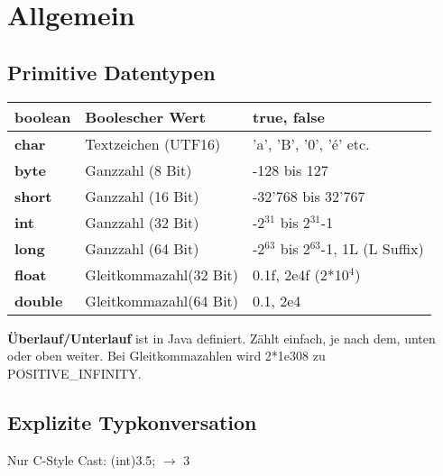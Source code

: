 \vspace{-0.5cm}
\section*{Allgemein}
	\begin{minipage}[t]{10cm}
		\subsection*{Primitive Datentypen}
			\begin{tabular}{|>{\bfseries}l l l|}
				\hline   boolean & Boolescher Wert & true, false
				\\\hline char & Textzeichen (UTF16) & 'a', 'B', '0', 'é' etc.
				\\\hline byte & Ganzzahl (8 Bit) & -128 bis 127
				\\\hline short & Ganzzahl (16 Bit) & -32'768 bis 32'767
				\\\hline int & Ganzzahl (32 Bit) & -2$^{31}$ bis 2$^{31}$-1
				\\\hline long & Ganzzahl (64 Bit) & -2$^{63}$ bis 2$^{63}$-1, 1L (L Suffix)
				\\\hline float & Gleitkommazahl(32 Bit) & 0.1f, 2e4f (2*10$^4$)
				\\\hline double & Gleitkommazahl(64 Bit) & 0.1, 2e4 
				\\\hline
			\end{tabular}
		\end{minipage}
		\hspace*{0.6cm}
		\begin{minipage}[t]{8.4cm}
			\vspace*{0.7cm}
			\textbf{Überlauf/Unterlauf} ist in Java definiert. Zählt einfach, je nach dem, unten oder oben weiter. Bei Gleitkommazahlen wird 2*1e308 zu POSITIVE\_INFINITY.
			\subsection*{Explizite Typkonversation}
			Nur C-Style Cast: (int)3.5; $\rightarrow$ 3
			\\
		\end{minipage}
	
	\vspace{0.3cm}
	\vspace{0.3cm}
	